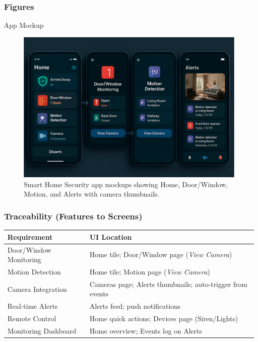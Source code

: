 \documentclass[conference]{IEEEtran}
\begin{document}
\subsubsection{Figures}
App Mockup
\begin{figure}[h]
  \centering
  \includegraphics[width=\linewidth]{AppMockup.png}
  \caption{Smart Home Security app mockups showing Home, Door/Window, Motion, and Alerts with camera thumbnails.}
\end{figure}

\subsubsection{Traceability (Features to Screens)}
\begin{center}
\begin{tabularx}{\linewidth}{@{}lX@{}}
\toprule
\textbf{Requirement} & \textbf{UI Location} \\\midrule
Door/Window Monitoring & Home tile; Door/Window page (\emph{View Camera}) \\
Motion Detection & Home tile; Motion page (\emph{View Camera}) \\
Camera Integration & Cameras page; Alerts thumbnails; auto-trigger from events \\
Real-time Alerts & Alerts feed; push notifications \\
Remote Control & Home quick actions; Devices page (Siren/Lights) \\
Monitoring Dashboard & Home overview; Events log on Alerts \\
\bottomrule
\end{tabularx}
\end{center}
\end{document}
